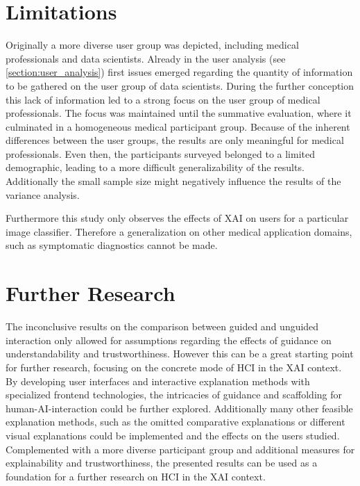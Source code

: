 \documentclass[11pt,a4paper,english]{scrreprt}
\begin{document}
\section{Limitations}
Originally a more diverse user group was depicted, including medical professionals and data scientists. Already in the user analysis (see \autoref{section:user_analysis}) first issues emerged regarding the quantity of information to be gathered on the user group of data scientists. During the further conception this lack of information led to a strong focus on the user group of medical professionals. The focus was maintained until the summative evaluation, where it culminated in a homogeneous medical participant group. Because of the inherent differences between the user groups, the results are only meaningful for medical professionals. Even then, the participants surveyed belonged to a limited demographic, leading to a more difficult generalizability of the results. Additionally the small sample size might negatively influence the results of the variance analysis.

Furthermore this study only observes the effects of XAI on users for a particular image classifier. Therefore a generalization on other medical application domains, such as symptomatic diagnostics cannot be made.

\section{Further Research}
The inconclusive results on the comparison between guided and unguided interaction only allowed for assumptions regarding the effects of guidance on understandability and trustworthiness. However this can be a great starting point for further research, focusing on the concrete mode of HCI in the XAI context. By developing user interfaces and interactive explanation methods with specialized frontend technologies, the intricacies of guidance and scaffolding for human-AI-interaction could be further explored. Additionally many other feasible explanation methods, such as the omitted comparative explanations or different visual explanations could be implemented and the effects on the users studied. Complemented with a more diverse participant group and additional measures for explainability and trustworthiness, the presented results can be used as a foundation for a further research on HCI in the XAI context.

\newpage
\end{document}
